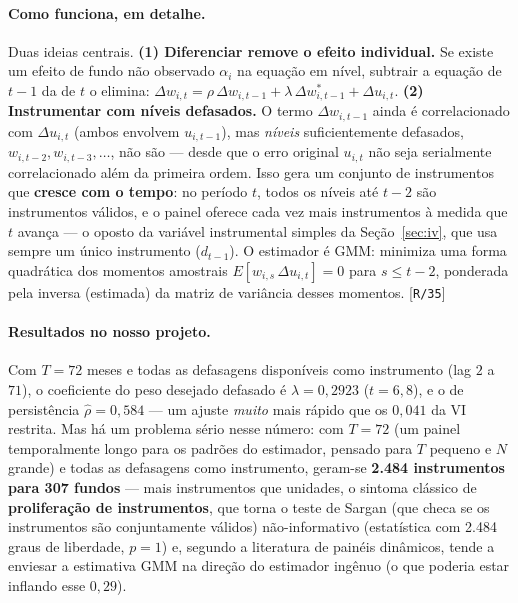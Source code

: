 \documentclass[11pt,a4paper]{article}
\newcommand{\comofunciona}[0]{\paragraph{Como funciona, em detalhe.}}
\newcommand{\resultados}[0]{\paragraph{Resultados no nosso projeto.}}
\newcommand{\scriptref}[1]{{\footnotesize\color{cinza}[\texttt{#1}]}}
\begin{document}
\comofunciona Duas ideias centrais. \textbf{(1) Diferenciar remove o efeito individual.} Se
existe um efeito de fundo não observado $\alpha_i$ na equação em nível, subtrair a equação de
$t-1$ da de $t$ o elimina: $\Delta w_{i,t} = \rho\,\Delta w_{i,t-1} + \lambda\,\Delta
w^*_{i,t-1} + \Delta u_{i,t}$. \textbf{(2) Instrumentar com níveis defasados.} O termo
$\Delta w_{i,t-1}$ ainda é correlacionado com $\Delta u_{i,t}$ (ambos envolvem $u_{i,t-1}$), mas
\emph{níveis} suficientemente defasados, $w_{i,t-2}, w_{i,t-3},\dots$, não são --- desde que o
erro original $u_{i,t}$ não seja serialmente correlacionado além da primeira ordem. Isso gera um
conjunto de instrumentos que \textbf{cresce com o tempo}: no período $t$, todos os níveis até
$t-2$ são instrumentos válidos, e o painel oferece cada vez mais instrumentos à medida que $t$
avança --- o oposto da variável instrumental simples da Seção~\ref{sec:iv}, que usa sempre um
único instrumento ($d_{t-1}$). O estimador é GMM: minimiza uma forma quadrática dos momentos
amostrais $E[w_{i,s}\,\Delta u_{i,t}]=0$ para $s\leq t-2$, ponderada pela inversa (estimada) da
matriz de variância desses momentos. \scriptref{R/35}

\resultados Com $T=72$ meses e todas as defasagens disponíveis como instrumento (lag $2$ a
$71$), o coeficiente do peso desejado defasado é $\widehat\lambda=0{,}2923$ ($t=6{,}8$), e o de
persistência $\widehat\rho=0{,}584$ --- um ajuste \emph{muito} mais rápido que os $0{,}041$ da VI
restrita. Mas há um problema sério nesse número: com $T=72$ (um painel temporalmente longo para
os padrões do estimador, pensado para $T$ pequeno e $N$ grande) e todas as defasagens como
instrumento, geram-se \textbf{2.484 instrumentos para 307 fundos} --- mais instrumentos que
unidades, o sintoma clássico de \textbf{proliferação de instrumentos}, que torna o teste de
Sargan (que checa se os instrumentos são conjuntamente válidos) não-informativo (estatística com
2.484 graus de liberdade, $p=1$) e, segundo a literatura de painéis dinâmicos, tende a enviesar a
estimativa GMM na direção do estimador ingênuo (o que poderia estar inflando esse $0{,}29$).
\end{document}
